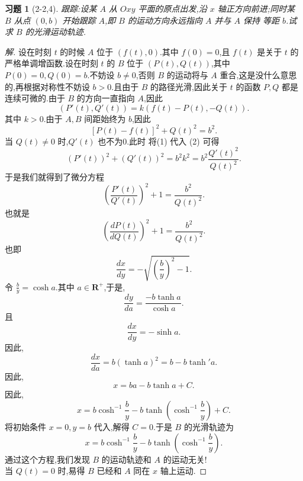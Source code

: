 \documentclass[a4paper, 12pt]{article} %
\newtheorem*{cdtheorem}{习题}
\newenvironment{exercise}
{\begin{mdframed}[backgroundcolor=gray!40,rightline=false,leftline=false,topline=false,bottomline=false]\begin{cdtheorem}}
    {\end{cdtheorem}\end{mdframed}\bigskip}
\begin{document}
\begin{exercise}[2-2,4]
跟踪:设某 $A$ 从 $Oxy$  平面的原点出发,沿 $x$ 轴正方向前进;同时某 $B$
从点 $(0,b)$ 开始跟踪 $A$,即 $B$ 的运动方向永远指向 $A$ 并与 $A$ 保持
等距 $b$.试求 $B$ 的光滑运动轨迹.
\end{exercise}
\begin{proof}[解]
设在时刻 $t$ 的时候 $A$ 位于 $(f(t),0)$.其中 $f(0)=0$,且 $f(t)$ 是关于
$t$ 的严格单调增函数.设在时刻 $t$ 的
$B$ 位于 $(P(t),Q(t))$,其中 $P(0)=0,Q(0)=b$.不妨设 $b\neq 0$,否则 $B$
的运动将与 $A$ 重合,这是没什么意思的,再根据对称性不妨设 $b>0$.且由于 $B$ 的路径光滑,因此关于
$t$ 的函数 $P,Q$ 都是连续可微的.由于 $B$ 的方向一直指向 $A$,因此
\begin{equation}
  \label{eq:10.51}
  (P'(t),Q'(t))=k(f(t)-P(t),-Q(t)).
\end{equation}
其中 $k>0$.由于 $A,B$ 间距始终为 $b$,因此
\begin{equation}
  \label{eq:10.52}
  [P(t)-f(t)]^2+Q(t)^2=b^2.
\end{equation}
当 $Q(t)\neq 0$ 时,$Q'(t)$ 也不为0.此时 将(1) 代入 (2) 可得
\begin{equation}
  \label{eq:11.02}
  (P'(t))^2+(Q'(t))^2=b^2k^2=b^2\frac{Q'(t)^{2}}{Q(t)^{2}}.
\end{equation}
于是我们就得到了微分方程
\begin{equation}
  \label{eq:11.54}
  (\frac{P'(t)}{Q'(t)})^2+1=\frac{b^2}{Q(t)^2}.
\end{equation}
也就是
$$
(\frac{dP(t)}{dQ(t)})^2+1=\frac{b^2}{Q(t)^2}.
$$
也即
$$
\frac{dx}{dy}=-\sqrt{(\frac{b}{y})^2-1}.
$$
令 $\frac{b}{y}=\cosh a$.其中 $a\in \mathbf{R}^{+}$,于是,
$$
\frac{dy}{da}=\frac{-b\tanh a}{\cosh a}.
$$
且
$$
\frac{dx}{dy}=-\sinh a.
$$
因此,
$$
\frac{dx}{da}=b(\tanh a)^2=b-b\tanh'a.
$$
因此,
$$
x=ba-b\tanh a+C.
$$
因此,
$$
x=b\cosh^{-1}\frac{b}{y}-b\tanh(\cosh^{-1}\frac{b}{y})+C.
$$
将初始条件 $x=0,y=b$ 代入,解得 $C=0$.于是 $B$ 的光滑轨迹为
$$
x=b\cosh^{-1}\frac{b}{y}-b\tanh(\cosh^{-1}\frac{b}{y}).
$$
通过这个方程,我们发现 $B$ 的运动轨迹和 $A$ 的运动无关!\\

当 $Q(t)=0$ 时,易得 $B$ 已经和 $A$ 同在 $x$ 轴上运动.
\end{proof}





\end{document}
